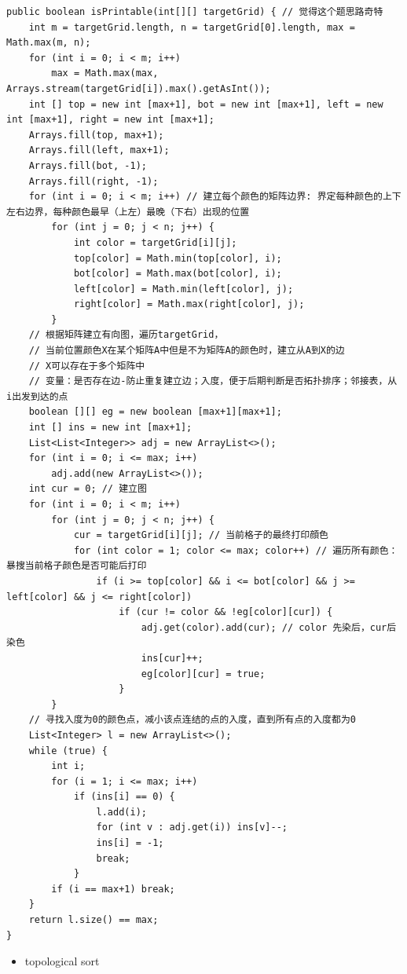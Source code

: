 \documentclass[9pt, b5paaper]{book}
\begin{document}
\begin{verbatim}
public boolean isPrintable(int[][] targetGrid) { // 觉得这个题思路奇特
    int m = targetGrid.length, n = targetGrid[0].length, max = Math.max(m, n);
    for (int i = 0; i < m; i++) 
        max = Math.max(max, Arrays.stream(targetGrid[i]).max().getAsInt());
    int [] top = new int [max+1], bot = new int [max+1], left = new int [max+1], right = new int [max+1];
    Arrays.fill(top, max+1);
    Arrays.fill(left, max+1);
    Arrays.fill(bot, -1);
    Arrays.fill(right, -1);
    for (int i = 0; i < m; i++) // 建立每个颜色的矩阵边界: 界定每种颜色的上下左右边界，每种颜色最早（上左）最晚（下右）出现的位置
        for (int j = 0; j < n; j++) {
            int color = targetGrid[i][j];
            top[color] = Math.min(top[color], i);
            bot[color] = Math.max(bot[color], i);
            left[color] = Math.min(left[color], j);
            right[color] = Math.max(right[color], j);
        }
    // 根据矩阵建立有向图，遍历targetGrid，
    // 当前位置颜色X在某个矩阵A中但是不为矩阵A的颜色时，建立从A到X的边
    // X可以存在于多个矩阵中
    // 变量：是否存在边-防止重复建立边；入度，便于后期判断是否拓扑排序；邻接表，从i出发到达的点
    boolean [][] eg = new boolean [max+1][max+1];
    int [] ins = new int [max+1];
    List<List<Integer>> adj = new ArrayList<>();
    for (int i = 0; i <= max; i++) 
        adj.add(new ArrayList<>());
    int cur = 0; // 建立图
    for (int i = 0; i < m; i++) 
        for (int j = 0; j < n; j++) {
            cur = targetGrid[i][j]; // 当前格子的最终打印顔色
            for (int color = 1; color <= max; color++) // 遍历所有颜色：暴搜当前格子颜色是否可能后打印
                if (i >= top[color] && i <= bot[color] && j >= left[color] && j <= right[color])
                    if (cur != color && !eg[color][cur]) {
                        adj.get(color).add(cur); // color 先染后，cur后染色
                        ins[cur]++;
                        eg[color][cur] = true;
                    }
        }
    // 寻找入度为0的颜色点，减小该点连结的点的入度，直到所有点的入度都为0
    List<Integer> l = new ArrayList<>();
    while (true) {
        int i;
        for (i = 1; i <= max; i++) 
            if (ins[i] == 0) {
                l.add(i);
                for (int v : adj.get(i)) ins[v]--;
                ins[i] = -1;
                break;
            }
        if (i == max+1) break;
    }
    return l.size() == max;
}
\end{verbatim}
\begin{itemize}
\item topological sort
\end{itemize}
\end{document}
